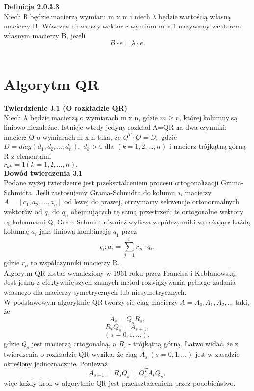 \documentclass[10pt,a4paper]{report}
\begin{document}
\noindent \textbf{Definicja 2.0.3.3}\\
\noindent Niech B będzie macierzą wymiaru m x m i niech $\lambda$ będzie wartością własną macierzy B. Wówczas niezerowy wektor e wymiaru m x 1 nazywamy wektorem własnym macierzy B, jeżeli $$B\cdot e = \lambda\cdot e. $$\\











\chapter{Algorytm QR}

\noindent \textbf{Twierdzienie 3.1 (O rozkładzie QR)}\\
\noindent Niech A będzie macierzą o wymiarach m x n, gdzie $m\ge n$, której kolumny są liniowo niezależne. Istnieje wtedy jedyny rozkład A=QR na dwa czynniki: macierz Q o wymiarach m x n taka, że $Q^{T}\cdot Q=D,$ gdzie\\ $D= diag (d_{1}, d_{2}, ..., d_{n}),$  $d_{k}>0$ dla $(k = 1, 2, ..., n)$ i macierz trójkątną górną R z elementami\\ $r_{kk}= 1 (k = 1, 2, ..., n).$\\

\noindent \textbf{Dowód twierdzenia 3.1}\\
\noindent Podane wyżej twierdzenie jest przekształceniem
procesu ortogonalizacji Grama-Schmidta. Jeśli zastosujemy Grama-Schmidta do kolumn $a_{i}$ macierzy
 $A = [a_{1}, a_{2}, ..., a_{n}]$ od lewej do prawej, otrzymamy
sekwencje ortonormalnych wektorów od $q_{1}$ do $q_{n}$ obejmujących tę samą przestrzeń:
te ortogonalne wektory są kolumnami Q. Gram-Schmidt również wylicza
współczynniki wyrażające każdą kolumnę $a_{i}$
 jako liniową kombinację $q_{1}$ przez $$q_{i}: a_{i}= \sum_{j=1}^i r_{ji}\cdot q_{i}, $$ gdzie $r_{ji}$ to współczynniki macierzy R.\\


\noindent Algorytm QR został wynaleziony w 1961 roku przez Francisa i Kubłanowską. Jest jedną z efektywniejszych znanych metod rozwiązywania pełnego zadania własnego dla macierzy symetrycznych lub niesymetrycznych.\\
\noindent W podstawowym algorytmie QR tworzy się ciąg macierzy $A= A_{0}, A_{1}, A_{2}, ...$ taki, że $$ A_{s}=Q_{s}R_{s},$$ $$R_{s}Q_{s}=A_{s+1},$$ $$(s=0, 1, ...),$$ gdzie $Q_{s}$ jest macierzą ortogonalną, a $R_{s}$ - trójkątną górną. Łatwo widać, że z twierdzenia o rozkładzie QR wynika, że ciąg $A_{s}$ $(s=0, 1, ...)$ jest w zasadzie określony jednoznacznie. Ponieważ $$ A_{s+1}=R_{s}Q_{s}=Q_{s}^{T}A_{s}Q_{s},$$ więc każdy krok w algorytmie QR jest przekształceniem przez podobieństwo. \\
\end{document}
